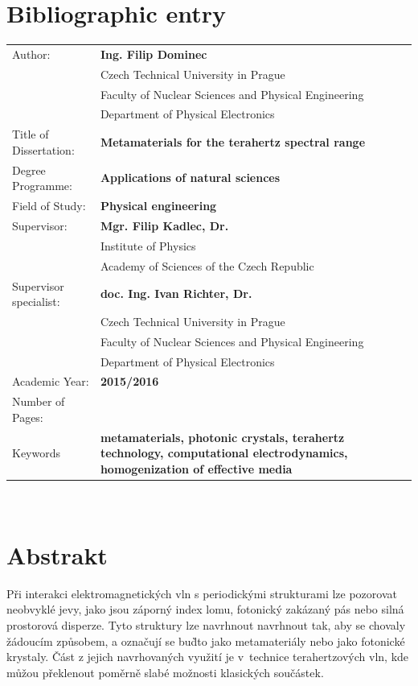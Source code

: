 {\let\clearpage\relax\chapter*{Bibliographic entry}}
\bgroup {}
\noindent\begin{tabular}{p{.30\linewidth}p{.65\linewidth}}
Author:					&\textbf{Ing. Filip Dominec} \\
					~	&Czech Technical University in Prague\\
					~	&Faculty of Nuclear Sciences and Physical Engineering\\ 
					~	&Department of Physical Electronics\\
Title of Dissertation:	&\textbf{Metamaterials for the terahertz spectral range} \\
Degree Programme:		&\textbf{Applications of natural sciences} \\
Field of Study:			&\textbf{Physical engineering} \\
Supervisor:				&\textbf{Mgr. Filip Kadlec, Dr.} \\
					~	&Institute of Physics\\ 
					~	&Academy of Sciences of the Czech Republic\\  %
Supervisor specialist:	&\textbf{doc. Ing. Ivan Richter, Dr.} \\
					~	&Czech Technical University in Prague\\ 
					~	&Faculty of Nuclear Sciences and Physical Engineering\\  
					~	&Department of Physical Electronics\\
Academic Year:			&\textbf{2015/2016} \\
Number of Pages:		&\textbf{\pageref{enddocument}} \\
Keywords				&\textbf{metamaterials, photonic crystals, terahertz technology, computational electrodynamics, homogenization of effective media} \\
\end{tabular}
\egroup
\thispagestyle{empty} \newpage  ~ \thispagestyle{empty} \newpage \setcounter{page}{1}


\vspace{-20mm}
{\let\clearpage\relax\chapter*{Abstrakt}}
\noindent 
Při interakci elektromagnetických vln s periodickými strukturami lze pozorovat neobvyklé jevy, jako jsou záporný index lomu, fotonický zakázaný pás nebo silná prostorová disperze. Tyto struktury lze navrhnout navrhnout tak, aby se chovaly žá\-dou\-cím způsobem, a označují se bu\`dto jako metamateriály nebo jako foto\-nic\-ké krys\-taly. Část z jejich navrhovaných využití je v~technice terahertzových vln, kde můžou překlenout po\-měr\-ně slabé možnosti kla\-sických součástek.  

